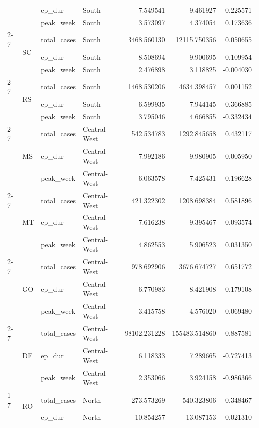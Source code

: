 \documentclass{report}
\begin{document}
\begin{center}
\begin{center}
\begin{longtable}{llllrrr}
 &  & ep\_dur & South & 7.549541 & 9.461927 & 0.225571 \\
 &  & peak\_week & South & 3.573097 & 4.374054 & 0.173636 \\
\cline{2-7}
 & \multirow[t]{3}{*}{SC} & total\_cases & South & 3468.560130 & 12115.750356 & 0.050655 \\
 &  & ep\_dur & South & 8.508694 & 9.900695 & 0.109954 \\
 &  & peak\_week & South & 2.476898 & 3.118825 & -0.004030 \\
\cline{2-7}
 & \multirow[t]{3}{*}{RS} & total\_cases & South & 1468.530206 & 4634.398457 & 0.001152 \\
 &  & ep\_dur & South & 6.599935 & 7.944145 & -0.366885 \\
 &  & peak\_week & South & 3.795046 & 4.666855 & -0.332434 \\
\cline{2-7}
 & \multirow[t]{3}{*}{MS} & total\_cases & Central-West & 542.534783 & 1292.845658 & 0.432117 \\
 &  & ep\_dur & Central-West & 7.992186 & 9.980905 & 0.005950 \\
 &  & peak\_week & Central-West & 6.063578 & 7.425431 & 0.196628 \\
\cline{2-7}
 & \multirow[t]{3}{*}{MT} & total\_cases & Central-West & 421.322302 & 1208.698384 & 0.581896 \\
 &  & ep\_dur & Central-West & 7.616238 & 9.395467 & 0.093574 \\
 &  & peak\_week & Central-West & 4.862553 & 5.906523 & 0.031350 \\
\cline{2-7}
 & \multirow[t]{3}{*}{GO} & total\_cases & Central-West & 978.692906 & 3676.674727 & 0.651772 \\
 &  & ep\_dur & Central-West & 6.770983 & 8.421908 & 0.179108 \\
 &  & peak\_week & Central-West & 3.415758 & 4.576020 & 0.069480 \\
\cline{2-7}
 & \multirow[t]{3}{*}{DF} & total\_cases & Central-West & 98102.231228 & 155483.514860 & -0.887581 \\
 &  & ep\_dur & Central-West & 6.118333 & 7.289665 & -0.727413 \\
 &  & peak\_week & Central-West & 2.353066 & 3.924158 & -0.986366 \\
\cline{1-7} \cline{2-7}
\multirow[t]{81}{*}{2023} & \multirow[t]{3}{*}{RO} & total\_cases & North & 273.573269 & 540.323806 & 0.348467 \\
 &  & ep\_dur & North & 10.854257 & 13.087153 & 0.021310 \\

\end{longtable}
\end{center}
\end{center}
\end{document}
